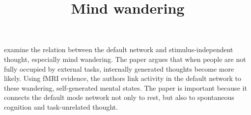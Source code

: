 \documentclass[a4paper]{article}
\title{Mind wandering}
\date{}
\begin{document}
\maketitle

    \cite{mason-2007-wandering-minds-the-default-network-and-stimulus-independent-thought} examine the relation between the default network and stimulus-independent thought, especially mind wandering. The paper argues that when people are not fully occupied by external tasks, internally generated thoughts become more likely. Using fMRI evidence, the authors link activity in the default network to these wandering, self-generated mental states. The paper is important because it connects the default mode network not only to rest, but also to spontaneous cognition and task-unrelated thought.
    
    
\end{document}
